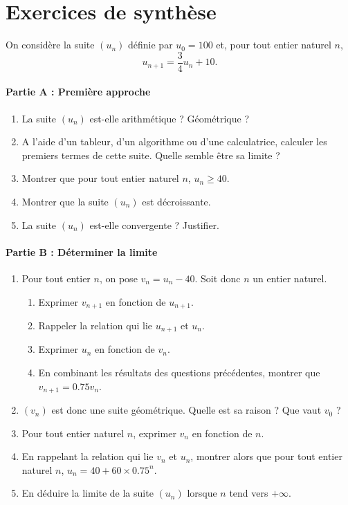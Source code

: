 \documentclass[11pt,fleqn, openany]{book} %
\begin{document}


\section*{Exercices de synthèse}


\begin{exercise}[topic=lim14, subtitle={(Suite arithmético-géométrique : découverte guidée)}]

On considère la suite $(u_n)$ définie par $u_0=100$ et, pour tout entier naturel $n$, \[u_{n+1}=\dfrac{3}{4}u_n +10.\]

\paragraph{Partie A : Première approche}
\begin{enumerate}
\item La suite $(u_n)$ est-elle arithmétique ? Géométrique ?
\item A l'aide d'un tableur, d'un algorithme ou d'une calculatrice, calculer les premiers termes de cette suite. Quelle semble être sa limite ?
\item Montrer que pour tout entier naturel $n$, $u_n\geqslant 40$.
\item Montrer que la suite $(u_n)$ est décroissante.
\item La suite $(u_n)$ est-elle convergente ? Justifier.\end{enumerate}

\paragraph{Partie B : Déterminer la limite}
\begin{enumerate}

\item Pour tout entier $n$, on pose $v_n = u_n-40$. Soit donc $n$ un entier naturel.
\begin{enumerate}
\item Exprimer $v_{n+1}$ en fonction de $u_{n+1}$.
\item Rappeler la relation qui lie $u_{n+1}$ et $u_n$.
\item Exprimer $u_n$ en fonction de $v_n$.
\item En combinant les résultats des questions précédentes, montrer que $v_{n+1}=0.75v_n$.
\end{enumerate}
\item $(v_n)$ est donc une suite géométrique. Quelle est sa raison ? Que vaut $v_0$ ?
\item Pour tout entier naturel $n$, exprimer $v_n$ en fonction de $n$.
\item En rappelant la relation qui lie $v_n$ et $u_n$, montrer alors que pour tout entier naturel $n$, $u_n=40+60 \times 0.75^n$.
\item En déduire la limite de la suite $(u_n)$ lorsque $n$ tend vers $+\infty$.
\end{enumerate}\end{exercise}
\end{document}
